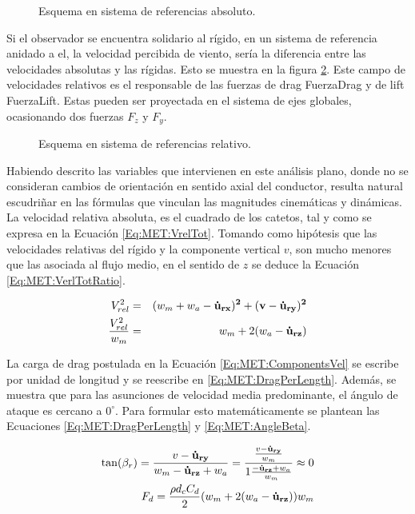 \begin{figure}[htbp]
	\centering
	\def\svgwidth{60mm}
	
	\caption{Esquema en sistema de referencias absoluto.}
	\label{fig:MET:Viento:VelAbs}
\end{figure}

Si el observador se encuentra solidario al rígido, en un sistema de referencia anidado a el, la velocidad percibida de viento, sería la diferencia entre las velocidades absolutas y las rígidas. Esto se muestra en la figura \ref{fig:MET:Viento:VelRel}. Este campo de velocidades relativos es el responsable de las fuerzas de drag \gls{FuerzaDrag} y  de lift \gls{FuerzaLift}. Estas pueden ser proyectada en el sistema de ejes globales, ocasionando dos fuerzas $F_z$ y $F_y$.


\begin{figure}[htbp]
	\centering
	\def\svgwidth{80mm}
	
	\caption{Esquema en sistema de referencias relativo.}
	\label{fig:MET:Viento:VelRel}
\end{figure}

Habiendo descrito las variables que intervienen en este análisis plano, donde no se consideran cambios de orientación en sentido axial del conductor, resulta natural escudriñar en las fórmulas que vinculan las magnitudes cinemáticas y dinámicas. La velocidad relativa absoluta, es el cuadrado de los catetos, tal y como se expresa en la Ecuación \eqref{Eq:MET:VrelTot}. Tomando como hipótesis que las velocidades relativas del rígido y la componente vertical $v$, son mucho menores que las asociada al flujo medio, en el sentido de $z$ se deduce la Ecuación \eqref{Eq:MET:VerlTotRatio}. 


\begin{eqnarray}
	\label{Eq:MET:VrelTot}
	V_{rel}^2&=&(w_m+w_a-\bf{\dot{u}}_{rx})^2+(v-\bf{\dot{u}}_{ry})^2\\
	\label{Eq:MET:VerlTotRatio}
	\frac{V_{rel}^2}{w_m}&=&w_m + 2 (w_a-\bf{\dot{u}}_{rz})
\end{eqnarray}

La carga de drag postulada en la Ecuación \eqref{Eq:MET:ComponentsVel} se escribe por unidad de longitud y se reescribe en \eqref{Eq:MET:DragPerLength}. Además, se muestra que para las asunciones de velocidad media predominante, el ángulo de ataque es cercano a $0^{\circ}$. Para formular esto matemáticamente se plantean las Ecuaciones \eqref{Eq:MET:DragPerLength} y \eqref{Eq:MET:AngleBeta}.

\begin{eqnarray}
	\label{Eq:MET:AngleBeta}
	\tan (\beta_r) = \frac{v-\bf{\dot{u}}_{ry}}{w_m - \bf{\dot{u}}_{rz} + \text{$w_a$}}=\frac{\frac{v-\bf{\dot{u}}_{ry}}{w_m}}{1 \frac{- \bf{\dot{u}}_{rz} +\text{$w_a$}}{w_m}}\approx 0 \\
	\label{Eq:MET:DragPerLength}
	F_d = \frac{\rho d_c C_d}{2} (w_m + 2 (w_a-\bf{\dot{u}}_{rz}))\text{$w_m$}
\end{eqnarray}


